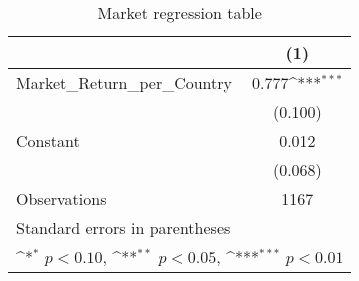 \begin{table}[htbp]\centering
\def\sym#1{\ifmmode^{#1}\else\(^{#1}\)\fi}
\caption{Market regression table \label{reg1}}
\begin{tabular}{l*{1}{c}}
\toprule
                    &\multicolumn{1}{c}{(1)}         \\
\midrule
Market\_Return\_per\_Country&       0.777\sym{***}\\
                    &     (0.100)         \\
\addlinespace
Constant            &       0.012         \\
                    &     (0.068)         \\
\midrule
Observations        &        1167         \\
\bottomrule
\multicolumn{2}{l}{\footnotesize Standard errors in parentheses}\\
\multicolumn{2}{l}{\footnotesize \sym{*} \(p<0.10\), \sym{**} \(p<0.05\), \sym{***} \(p<0.01\)}\\
\end{tabular}
\end{table}
